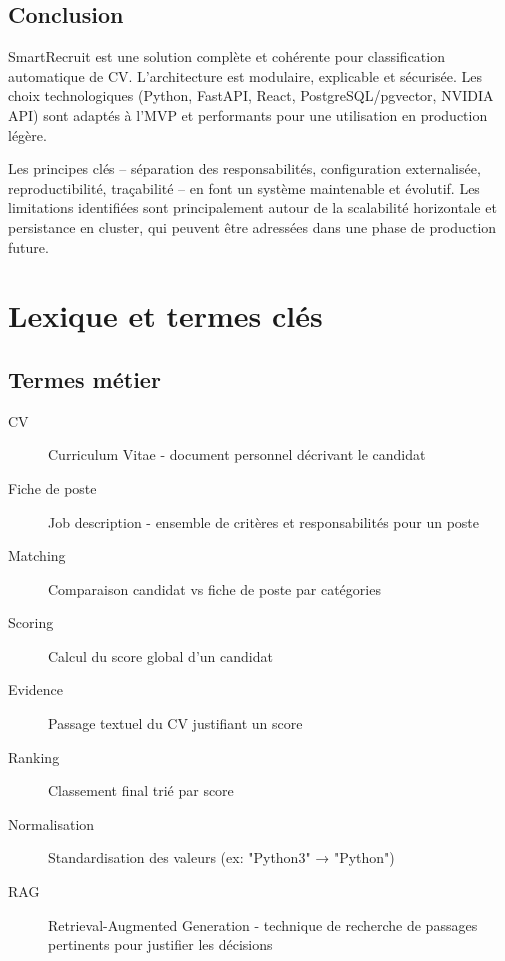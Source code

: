 \documentclass[12pt,a4paper,oneside]{book}
\begin{document}
\section{Conclusion}

SmartRecruit est une solution complète et cohérente pour classification automatique de CV. L'architecture est modulaire, explicable et sécurisée. Les choix technologiques (Python, FastAPI, React, PostgreSQL/pgvector, NVIDIA API) sont adaptés à l'MVP et performants pour une utilisation en production légère.

Les principes clés -- séparation des responsabilités, configuration externalisée, reproductibilité, traçabilité -- en font un système maintenable et évolutif. Les limitations identifiées sont principalement autour de la scalabilité horizontale et persistance en cluster, qui peuvent être adressées dans une phase de production future.

\appendix

\chapter{Lexique et termes clés}

\section{Termes métier}

\begin{description}
    \item[CV] Curriculum Vitae - document personnel décrivant le candidat
    
    \item[Fiche de poste] Job description - ensemble de critères et responsabilités pour un poste
    
    \item[Matching] Comparaison candidat vs fiche de poste par catégories
    
    \item[Scoring] Calcul du score global d'un candidat
    
    \item[Evidence] Passage textuel du CV justifiant un score
    
    \item[Ranking] Classement final trié par score
    
    \item[Normalisation] Standardisation des valeurs (ex: "Python3" → "Python")
    
    \item[RAG] Retrieval-Augmented Generation - technique de recherche de passages pertinents pour justifier les décisions
\end{description}
\end{document}
